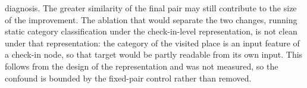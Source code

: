 \begin{enumerate}
    diagnosis. The greater similarity of
    the final pair may still contribute to the size of the improvement. The
    ablation that would separate the two changes,
    running static category classification under the check-in-level representation, is
    not clean under that representation: the category of the visited place is an input
    feature of a check-in node, so that target would be partly readable from its own
    input. This follows from the design of the representation and was not measured, so
    the confound is bounded by the fixed-pair control rather than removed.
\end{enumerate}


